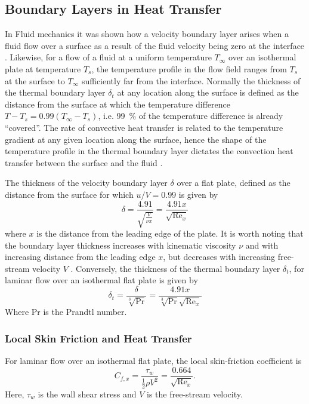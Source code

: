 \subsection{Boundary Layers in Heat Transfer}
In Fluid mechanics it was shown how a velocity boundary layer arises when a fluid flow over a surface as a result of the fluid velocity being zero at the interface \cite{hansen2026fluidmechanics}.
Likewise, for a flow of a fluid at a uniform temperature $T_{\infty}$ over an isothermal plate at temperature $T_s$, the temperature profile in the flow field ranges from $T_s$ at the surface to $T_{\infty}$ sufficiently far from the interface.
Normally the thickness of the thermal boundary layer $\delta_t$ at any location along the surface is defined as the distance from the surface at which the temperature difference $T-T_s = \num{0,99} (T_{\infty}- T_s)$, i.e. \qty{99}{\percent} of the temperature difference is already ``covered''.
The rate of convective heat transfer is related to the temperature gradient at any given location along the surface, hence the shape of the temperature profile in the thermal boundary layer dictates the convection heat transfer between the surface and the fluid .

The thickness of the velocity boundary layer $\delta$ over a flat plate, defined as the distance from the surface for which $u / V = \num{0,99}$ is given by 
\begin{equation*}
  \delta = \frac{\num{4,91}}{\sqrt{\frac{V}{\nu x}}} = \frac{\num{4,91} x}{\sqrt{\mathrm{Re}_x}}
\end{equation*}
where $x$ is the distance from the leading edge of the plate.
It is worth noting that the boundary layer thickness increases with kinematic viscosity $\nu$ and with increasing distance from the leading edge $x$, but decreases with increasing free-stream velocity $V$ .
Conversely, the thickness of the thermal boundary layer $\delta_t$, for laminar flow over an isothermal flat plate is given by 
\begin{equation*}
  \delta_t = \frac{\delta}{\sqrt[3]{\mathrm{Pr}}} = \frac{\num{4,91} x}{\sqrt[3]{\mathrm{Pr}} \sqrt{\mathrm{Re}_x}}
\end{equation*}
Where $\mathrm{Pr}$ is the Prandtl number.

\subsubsection{Local Skin Friction and Heat Transfer}
For laminar flow over an isothermal flat plate, the local skin-friction
coefficient is
\begin{equation*}
  C_{f,x}
  = \frac{\tau_w}{\frac{1}{2}\rho V^2}
  = \frac{0.664}{\sqrt{\mathrm{Re}_x}}
.\end{equation*}
Here, $\tau_w$ is the wall shear stress and $V$ is the free-stream velocity.


